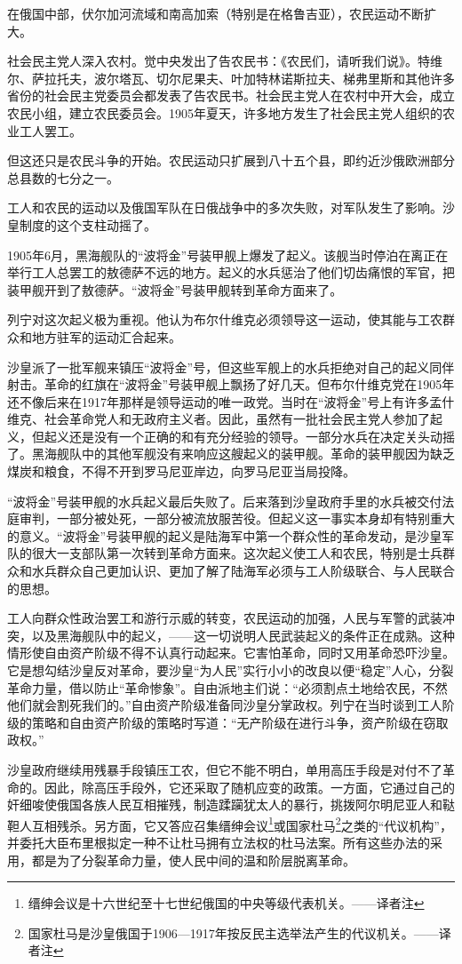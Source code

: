 在俄国中部，伏尔加河流域和南高加索（特别是在格鲁吉亚），农民运动不断扩大。

社会民主党人深入农村。觉中央发出了告农民书：《农民们，请听我们说》。特维尔、萨拉托夫，波尔塔瓦、切尔尼果夫、叶加特林诺斯拉夫、梯弗里斯和其他许多省份的社会民主党委员会都发表了告农民书。社会民主党人在农村中开大会，成立农民小组，建立农民委员会。1905年夏天，许多地方发生了社会民主党人组织的农业工人罢工。

但这还只是农民斗争的开始。农民运动只扩展到八十五个县，即约近沙俄欧洲部分总县数的七分之一。

工人和农民的运动以及俄国军队在日俄战争中的多次失败，对军队发生了影响。沙皇制度的这个支柱动摇了。

1905年6月，黑海舰队的“波将金”号装甲舰上爆发了起义。该舰当时停泊在离正在举行工人总罢工的敖德萨不远的地方。起义的水兵惩治了他们切齿痛恨的军官，把装甲舰开到了敖德萨。“波将金”号装甲舰转到革命方面来了。

列宁对这次起义极为重视。他认为布尔什维克必须领导这一运动，使其能与工农群众和地方驻军的运动汇合起来。

沙皇派了一批军舰来镇压“波将金”号，但这些军舰上的水兵拒绝对自己的起义同伴射击。革命的红旗在“波将金”号装甲舰上飘扬了好几天。但布尔什维克党在1905年还不像后来在1917年那样是领导运动的唯一政党。当时在“波将金”号上有许多孟什维克、社会革命党人和无政府主义者。因此，虽然有一批社会民主党人参加了起义，但起义还是没有一个正确的和有充分经验的领导。一部分水兵在决定关头动摇了。黑海舰队中的其他军舰没有来响应这艘起义的装甲舰。革命的装甲舰因为缺乏煤炭和粮食，不得不开到罗马尼亚岸边，向罗马尼亚当局投降。

“波将金”号装甲舰的水兵起义最后失败了。后来落到沙皇政府手里的水兵被交付法庭审判，一部分被处死，一部分被流放服苦役。但起义这一事实本身却有特别重大的意义。“波将金”号装甲舰的起义是陆海军中第一个群众性的革命发动，是沙皇军队的很大一支部队第一次转到革命方面来。这次起义使工人和农民，特别是士兵群众和水兵群众自己更加认识、更加了解了陆海军必须与工人阶级联合、与人民联合的思想。

工人向群众性政治罢工和游行示威的转变，农民运动的加强，人民与军警的武装冲突，以及黑海舰队中的起义，——这一切说明人民武装起义的条件正在成熟。这种情形使自由资产阶级不得不认真行动起来。它害怕革命，同时又用革命恐吓沙皇。它是想勾结沙皇反对革命，要沙皇“为人民”实行小小的改良以便“稳定”人心，分裂革命力量，借以防止“革命惨象”。自由派地主们说：“必须割点土地给农民，不然他们就会割死我们的。”自由资产阶级准备同沙皇分掌政权。列宁在当时谈到工人阶级的策略和自由资产阶级的策略时写道：“无产阶级在进行斗争，资产阶级在窃取政权。”

沙皇政府继续用残暴手段镇压工农，但它不能不明白，单用高压手段是对付不了革命的。因此，除高压手段外，它还采取了随机应变的政策。一方面，它通过自己的奸细唆使俄国各族人民互相摧残，制造蹂躏犹太人的暴行，挑拨阿尔明尼亚人和鞑靼人互相残杀。另方面，它又答应召集缙绅会议\footnote{缙绅会议是十六世纪至十七世纪俄国的中央等级代表机关。——译者注}或国家杜马\footnote{国家杜马是沙皇俄国于1906—1917年按反民主选举法产生的代议机关。——译者注}之类的“代议机构”，并委托大臣布里根拟定一种不让杜马拥有立法权的杜马法案。所有这些办法的采用，都是为了分裂革命力量，使人民中间的温和阶层脱离革命。

